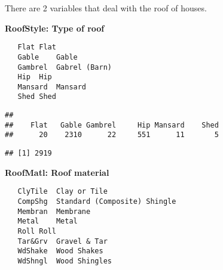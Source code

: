\documentclass[]{article}
\newenvironment{Shaded}{\begin{snugshade}}{\end{snugshade}}
\newcommand{\KeywordTok}[1]{\textcolor[rgb]{0.13,0.29,0.53}{\textbf{#1}}}
\newcommand{\StringTok}[1]{\textcolor[rgb]{0.31,0.60,0.02}{#1}}
\newcommand{\CommentTok}[1]{\textcolor[rgb]{0.56,0.35,0.01}{\textit{#1}}}
\newcommand{\OperatorTok}[1]{\textcolor[rgb]{0.81,0.36,0.00}{\textbf{#1}}}
\newcommand{\NormalTok}[1]{#1}
\begin{document}
There are 2 variables that deal with the roof of houses.

\textbf{RoofStyle: Type of roof}

\begin{verbatim}
   Flat Flat
   Gable    Gable
   Gambrel  Gabrel (Barn)
   Hip  Hip
   Mansard  Mansard
   Shed Shed
\end{verbatim}

\begin{Shaded}
\end{Shaded}

\begin{verbatim}
## 
##    Flat   Gable Gambrel     Hip Mansard    Shed 
##      20    2310      22     551      11       5
\end{verbatim}

\begin{Shaded}
\end{Shaded}

\begin{verbatim}
## [1] 2919
\end{verbatim}

\textbf{RoofMatl: Roof material}

\begin{verbatim}
   ClyTile  Clay or Tile
   CompShg  Standard (Composite) Shingle
   Membran  Membrane
   Metal    Metal
   Roll Roll
   Tar&Grv  Gravel & Tar
   WdShake  Wood Shakes
   WdShngl  Wood Shingles
\end{verbatim}

\begin{Shaded}
\end{Shaded}
\end{document}
